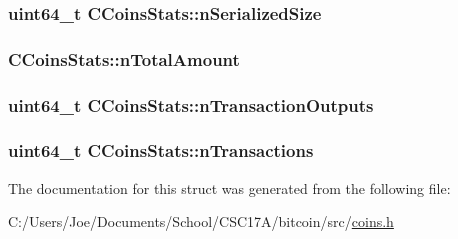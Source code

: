 \subsubsection[{n\+Serialized\+Size}]{\setlength{\rightskip}{0pt plus 5cm}uint64\+\_\+t C\+Coins\+Stats\+::n\+Serialized\+Size}\label{struct_c_coins_stats_ac4302ffc2f8be6e62dbc5655f77e4202}
\hypertarget{struct_c_coins_stats_a97c76344c650e55377d5f9246a906cc4}{}
\subsubsection[{n\+Total\+Amount}]{ C\+Coins\+Stats\+::n\+Total\+Amount}\label{struct_c_coins_stats_a97c76344c650e55377d5f9246a906cc4}
\hypertarget{struct_c_coins_stats_a02612be210ba7c628d04ddedd83b9ff0}{}
\subsubsection[{n\+Transaction\+Outputs}]{\setlength{\rightskip}{0pt plus 5cm}uint64\+\_\+t C\+Coins\+Stats\+::n\+Transaction\+Outputs}\label{struct_c_coins_stats_a02612be210ba7c628d04ddedd83b9ff0}
\hypertarget{struct_c_coins_stats_a0b04da159443c350e9b9e8a39c6a82db}{}
\subsubsection[{n\+Transactions}]{\setlength{\rightskip}{0pt plus 5cm}uint64\+\_\+t C\+Coins\+Stats\+::n\+Transactions}\label{struct_c_coins_stats_a0b04da159443c350e9b9e8a39c6a82db}


The documentation for this struct was generated from the following file\+:\begin{DoxyCompactItemize}
\item 
C\+:/\+Users/\+Joe/\+Documents/\+School/\+C\+S\+C17\+A/bitcoin/src/\hyperlink{coins_8h}{coins.\+h}\end{DoxyCompactItemize}
